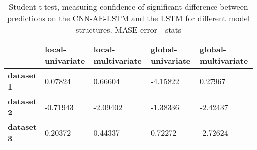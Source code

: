 \begin{table}[h]
\centering
\caption{Student t-test, measuring confidence of significant difference between predictions on the CNN-AE-LSTM and the LSTM for different model structures. MASE error - stats}
\label{table:ttest-stats-main-experiments-MASE}
\begin{tabular}{lllll}
\toprule
{} & local-univariate & local-multivariate & global-univariate & global-multivariate \\
\midrule
\textbf{dataset 1} &          0.07824 &            0.66604 &          -4.15822 &             0.27967 \\
\textbf{dataset 2} &         -0.71943 &           -2.09402 &          -1.38336 &            -2.42437 \\
\textbf{dataset 3} &          0.20372 &            0.44337 &           0.72272 &            -2.72624 \\
\bottomrule
\end{tabular}
\end{table}
